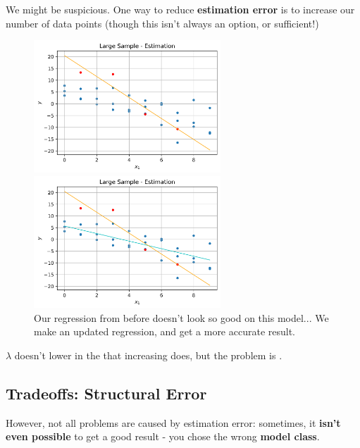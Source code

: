         We might be suspicious. One way to reduce \textbf{estimation error} is to increase our number of data points (though this isn't always an option, or sufficient!)
        
        \begin{figure}[H]

                \includegraphics[width=70mm,scale=0.5]{images/regression_images/Estimation_Full_Sample.png}
                
                \includegraphics[width=70mm,scale=0.5]{images/regression_images/Estimation_Full_Sample_Regression.png}
        
            \caption*{Our regression from before doesn't look so good on this model... We make an updated regression, and get a more accurate result.}
        \end{figure}
        
        \begin{clarification}
           $\lambda$ doesn't lower  in the  that increasing  does, but the problem is .
        \end{clarification}
        
    \subsection{Tradeoffs: Structural Error}
    
        However, not all problems are caused by estimation error: sometimes, it \textbf{isn't even possible} to get a good result - you chose the wrong \textbf{model class}.
        
